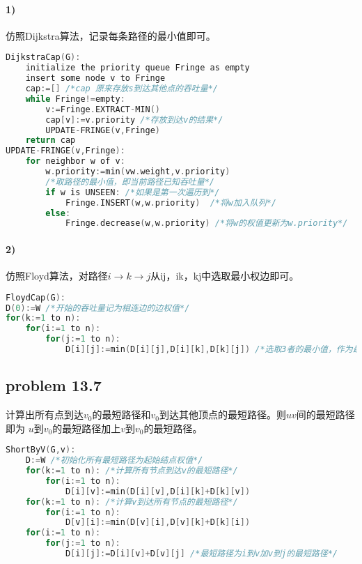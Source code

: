\documentclass[11pt,a4paper,oneside,oldfontcommands]{ctexart}
\begin{document}
\paragraph*{1)}仿照Dijkstra算法，记录每条路径的最小值即可。
\begin{lstlisting}[language=C++,title=DijkstraCap.func]
DijkstraCap(G):
	initialize the priority queue Fringe as empty
	insert some node v to Fringe
	cap:=[] /*cap 原来存放s到达其他点的吞吐量*/
	while Fringe!=empty:
		v:=Fringe.EXTRACT-MIN()
		cap[v]:=v.priority /*存放到达v的结果*/
		UPDATE-FRINGE(v,Fringe)
	return cap
UPDATE-FRINGE(v,Fringe):
	for neighbor w of v:
		w.priority:=min(vw.weight,v.priority) 
		/*取路径的最小值，即当前路径已知吞吐量*/
		if w is UNSEEN: /*如果是第一次遍历到*/
			Fringe.INSERT(w,w.priority)  /*将w加入队列*/
		else:
			Fringe.decrease(w,w.priority) /*将w的权值更新为w.priority*/
\end{lstlisting}
\paragraph*{2)}仿照Floyd算法，对路径$i \rightarrow k \rightarrow j$从ij，ik，kj中选取最小权边即可。
\begin{lstlisting}[language=C++,title=FloydCap.func]
FloydCap(G):
D(0):=W /*开始的吞吐量记为相连边的边权值*/
for(k:=1 to n):
	for(i:=1 to n):
		for(j:=1 to n):
			D[i][j]:=min(D[i][j],D[i][k],D[k][j]) /*选取3者的最小值，作为最大吞吐量*/
\end{lstlisting}
\newpage
{\subsection*{problem 13.7}}
计算出所有点到达$v_0$的最短路径和$v_0$到达其他顶点的最短路径。则$uv$间的最短路径即为
$u$到$v_0$的最短路径加上$v$到$v_0$的最短路径。
\begin{lstlisting}[language=C++,title=ShortByV.func]
ShortByV(G,v):
	D:=W /*初始化所有最短路径为起始结点权值*/
	for(k:=1 to n): /*计算所有节点到达v的最短路径*/
		for(i:=1 to n):
			D[i][v]:=min(D[i][v],D[i][k]+D[k][v])
	for(k:=1 to n): /*计算v到达所有节点的最短路径*/
		for(i:=1 to n):
			D[v][i]:=min(D[v][i],D[v][k]+D[k][i])
	for(i:=1 to n):
		for(j:=1 to n):
			D[i][j]:=D[i][v]+D[v][j] /*最短路径为i到v加v到j的最短路径*/
\end{lstlisting}
\end{document}
